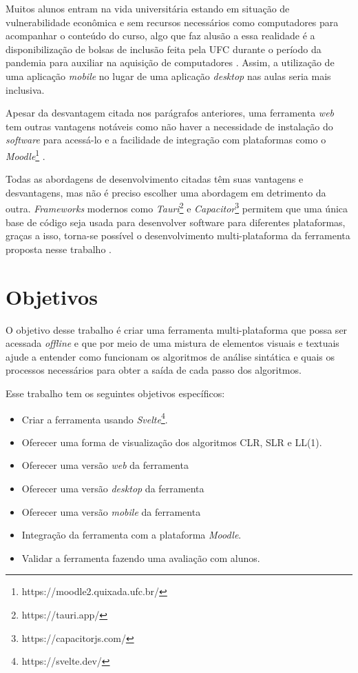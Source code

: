 Muitos alunos entram na vida universitária estando em situação de vulnerabilidade econômica e sem recursos necessários como computadores para acompanhar o conteúdo do curso, algo que faz alusão a essa realidade é a disponibilização de bolsas de inclusão feita pela UFC durante o período da pandemia para auxiliar na aquisição de computadores \cite{povo_ufc_2020}. Assim, a utilização de uma aplicação \textit{mobile} no lugar de uma aplicação \textit{desktop} nas aulas seria mais inclusiva.

Apesar da desvantagem citada nos parágrafos anteriores, uma ferramenta \textit{web} tem outras vantagens notáveis como não haver a necessidade de instalação do \textit{software} para acessá-lo e a facilidade de integração com plataformas como o \textit{Moodle}\footnote{https://moodle2.quixada.ufc.br/} \cite{desai_web_2022}.

Todas as abordagens de desenvolvimento citadas têm suas vantagens e desvantagens, mas não é preciso  escolher uma abordagem em detrimento da outra. \textit{Frameworks} modernos como \textit{Tauri}\footnote{https://tauri.app/} e \textit{Capacitor}\footnote{https://capacitorjs.com/} permitem que uma única base de código seja usada para desenvolver software para diferentes plataformas, graças a isso, torna-se possível o desenvolvimento multi-plataforma da ferramenta proposta nesse trabalho \cite{shevtsiv2021cross}.

\section{Objetivos}
O objetivo desse trabalho é criar uma ferramenta multi-plataforma que possa ser acessada \textit{offline} e que por meio de uma mistura de elementos visuais e textuais ajude a entender como funcionam os algoritmos de análise sintática e quais os processos necessários para obter a saída de cada passo dos algoritmos.

Esse trabalho tem os seguintes objetivos específicos:
\begin{itemize}[label=$\sbullet$]
    \item Criar a ferramenta usando \textit{Svelte}\footnote{https://svelte.dev/}.
    \item Oferecer uma forma de visualização dos algoritmos CLR, SLR e LL(1).
    \item Oferecer uma versão \textit{web} da ferramenta
    \item Oferecer uma versão \textit{desktop} da ferramenta
    \item Oferecer uma versão \textit{mobile} da ferramenta
    \item Integração da ferramenta com a plataforma \textit{Moodle}.
    \item Validar a ferramenta fazendo uma avaliação com alunos.
\end{itemize}

